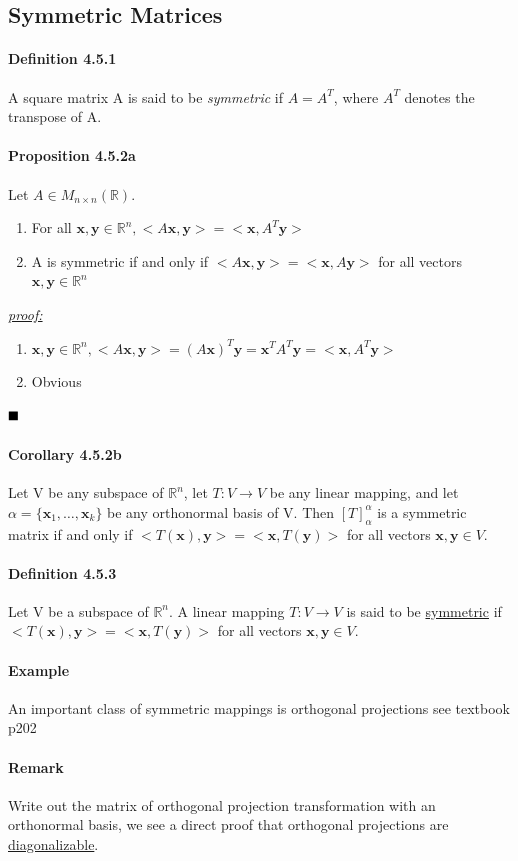 \documentclass[11pt]{article}
\newcommand{\ti}[1]{\textit{#1}}
\newcommand{\tb}[1]{\textbf{#1}}
\newcommand{\under}[1]{\underline{#1}}
\newcommand{\proof}[0]{\textit{\underline{proof:} }}
\newcommand{\qed}[0]{$\hfill\blacksquare$}
\newcommand{\real}[0]{\mathbb{R}}
\newcommand{\vx}[0]{\tb{x}}
\newcommand{\vy}[0]{\tb{y}}
\begin{document}
{\subsection{Symmetric Matrices}
\paragraph{Definition 4.5.1} A square matrix A is said to be \ti{symmetric} if $A = A^T$, where $A^T$ denotes the transpose of A.
\paragraph{Proposition 4.5.2a} Let $A \in M_{n\times n}(\real)$.
\begin{enumerate}
	\item For all $\vx, \vy \in \real^n, <A\vx,\vy> = <\vx,A^T\vy>$
	\item A is symmetric if and only if $<A\vx,\vy> = <\vx,A\vy>$ for all vectors $\vx,\vy \in \real^n$
\end{enumerate}
\proof \\
\begin{enumerate}
	\item $\vx, \vy \in \real^n, <A\vx,\vy>=(A\vx)^T\vy=\vx^TA^T\vy = <\vx,A^T\vy>$
	\item Obvious
\end{enumerate}
\qed
\paragraph{Corollary 4.5.2b} Let V be any subspace of $\real^n$, let $T: V \rightarrow V$ be any linear mapping, and let $\alpha = \{\vx_1,\hdots,\vx_k\}$ be any orthonormal basis of V. Then $[T]_\alpha^\alpha$ is a symmetric matrix if and only if $<T(\vx),\vy> = <\vx,T(\vy)>$ for all vectors $\vx, \vy \in V$.
\paragraph{Definition 4.5.3} Let V be a subspace of $\real^n$. A linear mapping $T: V \rightarrow V$ is said to be \under{symmetric} if $<T(\vx),\vy> = <\vx,T(\vy)>$ for all vectors $\vx, \vy \in V$.
\paragraph{Example}
An important class of symmetric mappings is orthogonal projections
see textbook p202
\paragraph{Remark}
Write out the matrix of orthogonal projection transformation with an orthonormal basis, we see a direct proof that orthogonal projections are \under{diagonalizable}.
}
\end{document}
